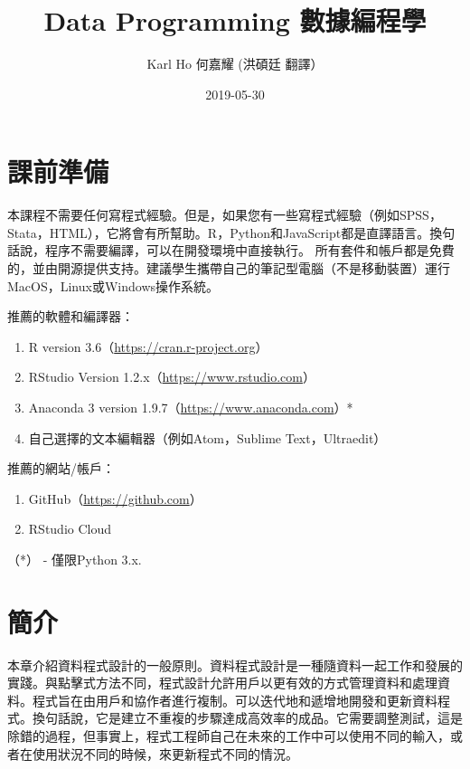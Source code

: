 \documentclass[]{book}
\title{Data Programming 數據編程學}
\author{Karl Ho 何嘉耀 (洪碩廷 翻譯）}
\date{2019-05-30}
\providecommand{\tightlist}{%
  \setlength{\itemsep}{0pt}\setlength{\parskip}{0pt}}
\begin{document}
\maketitle

{
\setcounter{tocdepth}{1}
\tableofcontents
}
\hypertarget{section}{%
\chapter{課前準備}\label{section}}

本課程不需要任何寫程式經驗。但是，如果您有一些寫程式經驗（例如SPSS，Stata，HTML），它將會有所幫助。R，Python和JavaScript都是直譯語言。換句話說，程序不需要編譯，可以在開發環境中直接執行。
所有套件和帳戶都是免費的，並由開源提供支持。建議學生攜帶自己的筆記型電腦（不是移動裝置）運行MacOS，Linux或Windows操作系統。

推薦的軟體和編譯器：

\begin{enumerate}
\def\labelenumi{\arabic{enumi}.}
\tightlist
\item
  R version 3.6（\url{https://cran.r-project.org}）
\item
  RStudio Version 1.2.x（\url{https://www.rstudio.com}）
\item
  Anaconda 3 version 1.9.7（\url{https://www.anaconda.com}）*
\item
  自己選擇的文本編輯器（例如Atom，Sublime Text，Ultraedit）
\end{enumerate}

推薦的網站/帳戶：

\begin{enumerate}
\def\labelenumi{\arabic{enumi}.}
\tightlist
\item
  GitHub（\url{https://github.com}）
\item
  RStudio Cloud
\end{enumerate}

（*） - 僅限Python 3.x.

\hypertarget{intro}{%
\chapter{簡介}\label{intro}}

本章介紹資料程式設計的一般原則。資料程式設計是一種隨資料一起工作和發展的實踐。與點擊式方法不同，程式設計允許用戶以更有效的方式管理資料和處理資料。程式旨在由用戶和協作者進行複制。可以迭代地和遞增地開發和更新資料程式。換句話說，它是建立不重複的步驟達成高效率的成品。它需要調整測試，這是除錯的過程，但事實上，程式工程師自己在未來的工作中可以使用不同的輸入，或者在使用狀況不同的時候，來更新程式不同的情況。
\end{document}
